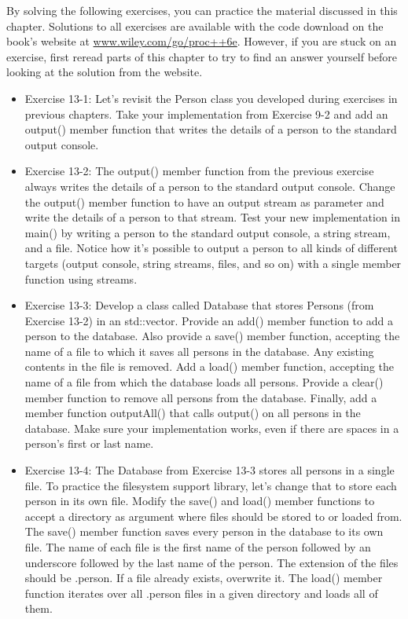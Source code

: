 By solving the following exercises, you can practice the material discussed in this chapter. Solutions to all exercises are available with the code download on the book’s website at \url{www.wiley.com/go/proc++6e}. However, if you are stuck on an exercise, first reread parts of this chapter to try to find an answer yourself before looking at the solution from the website.

\begin{itemize}
\item
Exercise 13-1: Let’s revisit the Person class you developed during exercises in previous chapters. Take your implementation from Exercise 9-2 and add an output() member function that writes the details of a person to the standard output console.

\item
Exercise 13-2: The output() member function from the previous exercise always writes the details of a person to the standard output console. Change the output() member function to have an output stream as parameter and write the details of a person to that stream. Test your new implementation in main() by writing a person to the standard output console, a string stream, and a file. Notice how it’s possible to output a person to all kinds of different targets (output console, string streams, files, and so on) with a single member function using streams.

\item
Exercise 13-3: Develop a class called Database that stores Persons (from Exercise 13-2) in an std::vector. Provide an add() member function to add a person to the database. Also provide a save() member function, accepting the name of a file to which it saves all persons in the database. Any existing contents in the file is removed. Add a load() member function, accepting the name of a file from which the database loads all persons. Provide a clear() member function to remove all persons from the database. Finally, add a member function outputAll() that calls output() on all persons in the database. Make sure your implementation works, even if there are spaces in a person’s first or last name.

\item
Exercise 13-4: The Database from Exercise 13-3 stores all persons in a single file. To practice the filesystem support library, let’s change that to store each person in its own file. Modify the save() and load() member functions to accept a directory as argument where files should be stored to or loaded from. The save() member function saves every person in the database to its own file. The name of each file is the first name of the person followed by an underscore followed by the last name of the person. The extension of the files should be .person. If a file already exists, overwrite it. The load() member function iterates over all .person files in a given directory and loads all of them.
\end{itemize}

